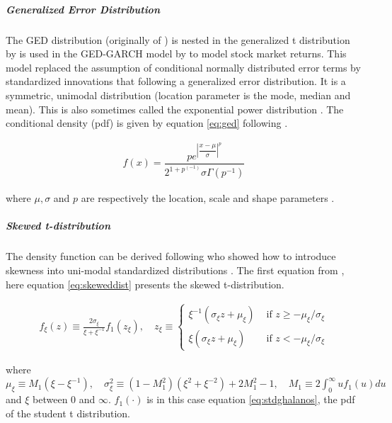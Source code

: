 \documentclass[a4paper, twoside]{templates/ociamthesis}
\begin{document}
\hypertarget{generalized-error-distribution}{%
\subparagraph{Generalized Error Distribution}\label{generalized-error-distribution}}

\noindent The GED distribution (originally of \textcite{subbotin}) is nested in the generalized t distribution by \textcite{mcdonald1988} is used in the GED-GARCH model by \textcite{nelson1991} to model stock market returns. This model replaced the assumption of conditional normally distributed error terms by standardized innovations that following a generalized error distribution. It is a symmetric, unimodal distribution (location parameter is the mode, median and mean). This is also sometimes called the exponential power distribution \autocite{bollerslev2008}. The conditional density (pdf) is given by equation \eqref{eq:ged} following \textcite{ghalanos2020}.

\begin{align}
f(x) = \dfrac{p e^{\left|\dfrac{x-\mu}{\sigma}\right|^p}}{2^{1+p^(-1)}\sigma\Gamma(p^{-1})}
 \label{eq:ged}
\end{align}

where \(\mu, \sigma\) and \(p\) are respectively the location, scale and shape parameters .

\hypertarget{skewed-t-distribution}{%
\subparagraph{Skewed t-distribution}\label{skewed-t-distribution}}

\noindent The density function can be derived following \textcite{fernández1998} who showed how to introduce skewness into uni-modal standardized distributions \autocite{trottier2015}. The first equation from \textcite{trottier2015}, here equation \eqref{eq:skeweddist} presents the skewed t-distribution.

\begin{align}
f_{\xi}(z) \equiv \frac{2 \sigma_{\xi}}{\xi+\xi^{-1}} f_{1}\left(z_{\xi}\right), \quad z_{\xi} \equiv\left\{\begin{array}{ll}
\xi^{-1}\left(\sigma_{\xi} z+\mu_{\xi}\right) & \text { if } z \geq-\mu_{\xi} / \sigma_{\xi} \\
\xi\left(\sigma_{\xi} z+\mu_{\xi}\right) & \text { if } z<-\mu_{\xi} / \sigma_{\xi}
\end{array}\right.
 \label{eq:skeweddist}
\end{align}

\noindent where \(\mu_{\xi} \equiv M_{1}\left(\xi-\xi^{-1}\right), \quad \sigma_{\xi}^{2} \equiv\left(1-M_{1}^{2}\right)\left(\xi^{2}+\xi^{-2}\right)+2 M_{1}^{2}-1, \quad M_{1} \equiv 2 \int_{0}^{\infty} u f_{1}(u) d u\) and \(\xi\) between \(0\) and \(\infty\). \(f_1(\cdot)\) is in this case equation \eqref{eq:stdghalanos}, the pdf of the student t distribution.
\end{document}
